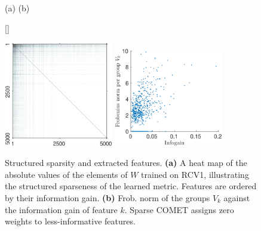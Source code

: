 \documentclass[twoside,11pt]{article}
\newcommand\mat[1]{{#1}}
\newcommand{\W}{\mat{W}}
\begin{document}
\begin{figure}[ht]
    \centerline{
    (a) \hspace{160pt} (b) \hspace{260pt} \newline{}
    }
    \captionsetup{font=small}
    [\FBwidth]
    {\caption{Structured sparsity and extracted features. {\bf (a)} A heat map of the absolute values of the elements of $\W$ trained on RCV1, illustrating the structured sparseness of the learned metric. Features are ordered by their information gain.  {\bf (b)} Frob. norm of the groups $V_k$ against the information gain of feature $k$. Sparse COMET assigns zero weights to less-informative features.}\label{fig:spmatrix}}
{
 \includegraphics[trim=0 -0.75cm 0 0,width=4.75cm]{sparse_W_visualization}
 \includegraphics[trim=0 0cm 0 0,width=4.75cm]{V_features_vs_infogain}
}
\vskip -10pt
\end{figure}


\vspace{-6pt}
\end{document}
